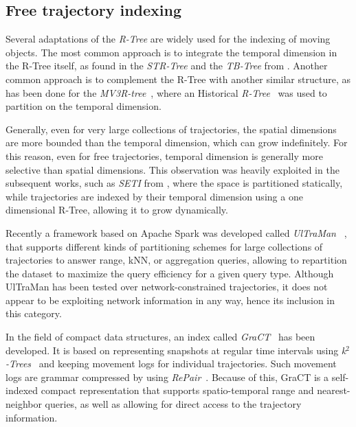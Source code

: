 \documentclass[a4paper,10pt,twoside]{book}
\begin{document}
	\subsection{Free trajectory indexing}
	Several adaptations of the {\em R-Tree} \cite{DBLP:conf/sigmod/Guttman84} are widely used for the indexing of moving objects. The most common approach is to integrate the temporal dimension in the R-Tree itself, as found in the {\em STR-Tree} and the {\em TB-Tree} from \cite{DBLP:conf/vldb/PfoserJT00}.
    Another common approach is to complement the R-Tree with another similar structure, as has been done for the {\em MV3R-tree}~\cite{DBLP:conf/vldb/PapadiasT01},
    where an Historical {\em R-Tree}~\cite{nascimento1998towards} was used to partition on the temporal dimension.
    
    Generally, even for very large collections of trajectories, the spatial dimensions are more bounded than the temporal dimension, which can grow indefinitely. For this reason, even for free trajectories, temporal dimension is generally more selective than spatial dimensions. This observation was heavily exploited in the subsequent works, such as {\em SETI} from \cite{chakka2003indexing}, where the space is partitioned statically, while trajectories are indexed by their temporal dimension using a one dimensional R-Tree, allowing it to grow dynamically.
    
    Recently a framework based on Apache Spark was developed called {\em UlTraMan}~ \cite{ding2018ultraman}, that supports different kinds of partitioning schemes for large collections of trajectories to answer range, kNN, or aggregation queries, allowing to repartition the dataset to maximize the query efficiency for a given query type. Although UlTraMan has been tested over \mbox{network-constrained} trajectories, it does not appear to be exploiting network information in any way, hence its inclusion in this category.
    
    In the field of compact data structures, an index called {\em GraCT}~\cite{brisaboa2019gract} has been developed. It is based on representing snapshots at regular time intervals using {\em k$^2$-Trees}~\cite{brisaboa2009k} and keeping movement logs for individual trajectories. Such movement logs are grammar compressed by using {\em RePair}~\cite{larsson2000off}. Because of this, GraCT is a self-indexed compact representation that supports spatio-temporal range and nearest-neighbor queries, as well as allowing for direct access to the trajectory information.
	
\end{document}

